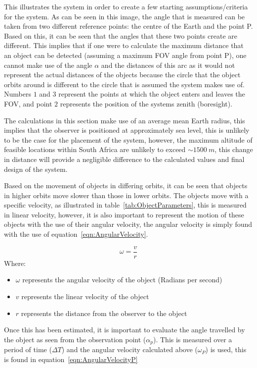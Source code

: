 \documentclass[11pt]{witseiepaper}
\begin{document}
\begin{bibunit}[witseie]
This illustrates the system in order to create a few starting assumptions/criteria for the system.
As can be seen in this image, the angle that is measured can be taken from two different reference points: the centre of the Earth and the point P. Based on this, it can be seen that the angles that these two points create are different. This implies that if one were to calculate the maximum distance that an object can be detected (assuming a maximum FOV angle from point P), one cannot make use of the angle $\alpha$ and the distances of this arc as it would not represent the actual distances of the objects because the circle that the object orbits around is different to the circle that is assumed the system makes use of.
Numbers $1$ and $3$ represent the points at which the object enters and leaves the FOV, and point $2$ represents the position of the systems zenith (boresight).


The calculations in this section make use of an average mean Earth radius, this implies that the observer is positioned at approximately sea level, this is unlikely to be the case for the placement of the system, however, the maximum altitude of feasible locations within South Africa are unlikely to exceed $\sim 1500~m$, this change in distance will provide a negligible difference to the calculated values and final design of the system.


Based on the movement of objects in differing orbits, it can be seen that objects in higher orbits move slower than those in lower orbits.
The objects move with a specific velocity, as illustrated in table~\ref{tab:ObjectParameters}, this is measured in linear velocity, however, it is also important to represent the motion of these objects with the use of their angular velocity, the angular velocity is simply found with the use of equation~\ref{eqn:AngularVelocity}.

\begin{equation} \label{eqn:AngularVelocity}
\omega = \frac{v}{r}
\end{equation}
Where:
\begin{itemize}
    \item $\omega$ represents the angular velocity of the object (Radians per second)
    \item $v$ represents the linear velocity of the object
    \item $r$ represents the distance from the observer to the object
\end{itemize}

Once this has been estimated, it is important to evaluate the angle travelled by the object as seen from the observation point ($\alpha_{p}$). This is measured over a period of time ($\Delta T$) and the angular velocity calculated above ($\omega_{P}$) is used, this is found in equation~\ref{eqn:AngularVelocityP}


\end{bibunit}
\end{document}
